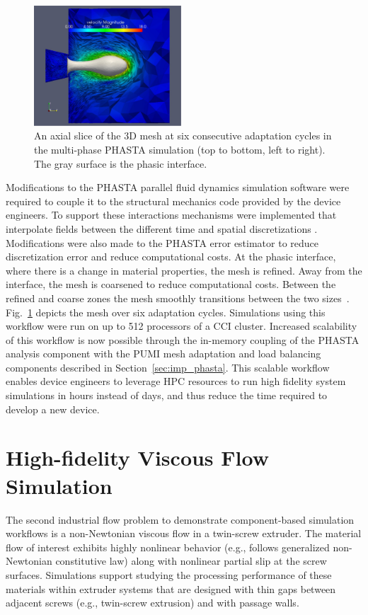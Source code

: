 \begin{figure}
  \includegraphics[width=0.49\textwidth]{figures/fig2f.eps}
  \caption{
    An axial slice of the 3D mesh at six consecutive adaptation cycles in the
    multi-phase PHASTA simulation (top to bottom, left to right).
    The gray surface is the phasic interface.
  }
  \label{fig:micromech}
\end{figure}

Modifications to the PHASTA parallel fluid dynamics simulation software
were required to couple it to the structural mechanics code
provided by the device engineers.
To support these interactions mechanisms were implemented that interpolate
fields between the different time and spatial discretizations .
Modifications were also made to the PHASTA error estimator to reduce
discretization error and reduce computational costs.
At the phasic interface, where there is a change in material properties, the
mesh is refined.
Away from the interface, the mesh is coarsened to reduce computational costs.
Between the refined and coarse zones the mesh smoothly transitions between
the two sizes~\cite{chitale2014anisotropic,Sahn06}.
Fig.~\ref{fig:micromech} depicts the mesh over six adaptation cycles.
Simulations using this workflow were run on up to 512 processors of a CCI
cluster.
Increased scalability of this workflow is now possible through the in-memory
coupling of the PHASTA analysis component with the PUMI mesh
adaptation and load balancing components described in
Section~\ref{sec:imp_phasta}.
This scalable workflow enables device engineers to leverage HPC resources to
run high fidelity system simulations in hours instead of days, and thus reduce
the time required to develop a new device.

\section{High-fidelity Viscous Flow Simulation}\label{sec:twinscrew}

The second industrial flow problem to demonstrate component-based simulation
workflows is a non-Newtonian viscous flow in a twin-screw extruder.
The material flow of interest exhibits highly nonlinear behavior (e.g.,
follows generalized non-Newtonian constitutive law) along with nonlinear partial
slip at the screw surfaces.
Simulations support studying the processing performance of these materials
within extruder systems that are designed with thin gaps between adjacent screws
(e.g., twin-screw extrusion) and with passage walls.

